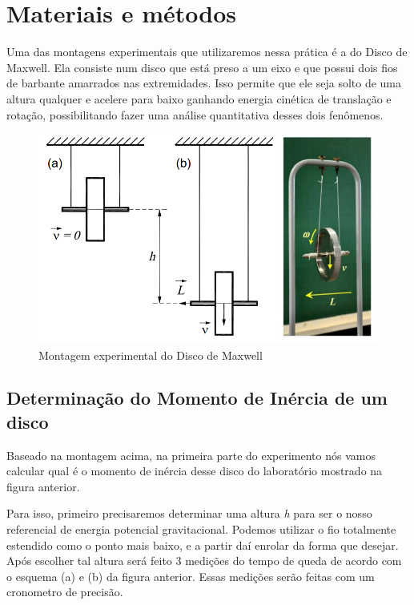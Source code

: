 \newpage
\section{Materiais e métodos}

Uma das montagens experimentais que utilizaremos nessa prática é a do Disco de Maxwell. Ela consiste num disco que está preso a um eixo e que possui dois fios de barbante amarrados nas extremidades. Isso permite que ele seja solto de uma altura qualquer e acelere para baixo ganhando energia cinética de translação e rotação, possibilitando fazer uma análise quantitativa desses dois fenômenos. 

\begin{figure}[H]
  \centering
  \includegraphics[scale=0.5]{images/setup-maxwell.png}
  \caption{Montagem experimental do Disco de Maxwell}
\end{figure}


\subsection{Determinação do Momento de Inércia de um disco}
Baseado na montagem acima, na primeira parte do experimento nós vamos calcular qual é o momento de inércia desse disco do laboratório mostrado na figura anterior.

Para isso, primeiro precisaremos determinar uma altura \textit{h} para ser o nosso referencial de energia potencial gravitacional. Podemos utilizar o fio totalmente estendido como o ponto mais baixo, e a partir daí enrolar da forma que desejar. Após escolher tal altura será feito 3 medições do tempo de queda de acordo com o esquema (a) e (b) da figura anterior. Essas medições serão feitas com um cronometro de precisão.

